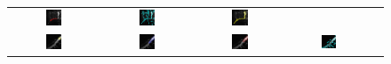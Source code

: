 \begin{figure}[t]
\begin{tabular}{@{}ccccc@{}}
\includegraphics[width=0.19\textwidth]{images/L2S_compare_region/neuron_clear_Lankton} &
\includegraphics[width=0.19\textwidth]{images/L2S_compare_region/neuron_clear_Li}	&
\includegraphics[width=0.19\textwidth]{images/L2S_compare_region/neuron_clear_ours}	
\\
\includegraphics[width=0.19\textwidth]{images/L2S_compare_region/spine2_orig}	&
\includegraphics[width=0.19\textwidth]{images/L2S_compare_region/spine2_CV}	&
\includegraphics[width=0.19\textwidth]{images/L2S_compare_region/spine2_Lankton} &
\includegraphics[width=0.19\textwidth]{images/L2S_compare_region/spine2_Li}	&

\end{tabular}
\end{figure}
